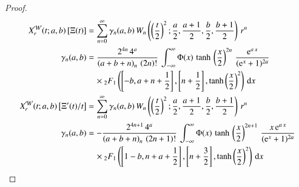 \documentclass[a4paper,11pt,twoside]{amsart}
\newcommand{\verifiedeq}{=}
\newcommand{\verifiedeq}{\stackrel{\checkmark}{=}}
\begin{document}
\begin{proof}
\begin{align}
X^\mathcal{W}_r(t;a,b)\left[\Xi(t)\right] &\verifiedeq \sum_{n=0}^\infty \gamma_{n}(a,b)\,W_{n}\left(\left(\frac{t}{2}\right)^2;\frac{a}{2},\frac{a+1}{2},\frac{b}{2},\frac{b+1}{2}\right)\,r^{n} \\
\gamma_n(a,b) &\verifiedeq \frac{2^{4n}\,4^a}{\left(a+b+n\right)_n\,(2n)!}\,\int_{-\infty}^{\infty} \Phi(x)\,\tanh\,\left(\frac{x}{2}\right)^{2n}\,\frac{\textrm{e}^{a\,x}}{(\textrm{e}^x+1)^{2a}} \\ &\quad \times {}_2F_1\left(\left[-b, a+n+\frac12\right],\left[n+\frac12\right],\tanh\left(\frac{x}{2}\right)^2\right)\,\mathrm{d}x \notag \\
X^\mathcal{W}_r(t;a,b)\left[\Xi'(t)/t\right] &\verifiedeq \sum_{n=0}^\infty \gamma_{n}(a,b)\,W_{n}\left(\left(\frac{t}{2}\right)^2;\frac{a}{2},\frac{a+1}{2},\frac{b}{2},\frac{b+1}{2}\right)\,r^{n} \\
\gamma_n(a,b) &\verifiedeq -\frac{2^{4n+1}\,4^a}{\left(a+b+n\right)_n\,(2n+1)!}\,\int_{-\infty}^{\infty} \Phi(x)\,\tanh\,\left(\frac{x}{2}\right)^{2n+1}\,\frac{x\,\textrm{e}^{a\,x}}{(\textrm{e}^x+1)^{2a}}\\\ &\quad\times{}_2F_1\left(\left[1-b, n+a+\frac12\right],\left[n+\frac32\right],\tanh\left(\frac{x}{2}\right)^2\right)\,\mathrm{d}x \notag
\end{align}
\end{proof}
\end{document}
